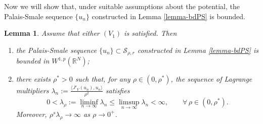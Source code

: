 \documentclass[11pt,reqno]{amsart}
\newtheorem{lemma}[theorem]{Lemma}
\theoremstyle{definition}
\numberwithin{equation}{section}
\numberwithin{theorem}{section}
\numberwithin{equation}{section}
\numberwithin{theorem}{section}
\newcommand{\rn}{\mathbb{R}^N}
\begin{document}
Now we will show that, under suitable assumptions about the potential, the Palais-Smale sequence $\{u_n\}$ constructed in Lemma \ref{lemma-bdPS} is bounded.
\begin{lemma}\label{lemma-bd-lambda>0}
Assume that either $(V_1)$ %
is satisfied. %
Then 
\begin{enumerate}
    \item the Palais-Smale sequence $\{u_n\}\subset \mathcal{S}_{\rho,r}$ constructed in Lemma \ref{lemma-bdPS} is bounded in $W^{1,p}(\rn)$;
    \item there exists $\rho^*>0$ such that, for any $\rho\in(0,\rho^*)$, the sequence of Lagrange multipliers $\lambda_n:=\frac{\langle J'_V(u_n),u_n\rangle}{\rho^2}$ satisfies 
    \begin{equation}\label{lambda-infty}
    0<\lambda_\rho:=\liminf_{n\to\infty}\lambda_n\le \limsup_{n\to\infty}\lambda_n<\infty,\qquad\forall\,\rho\in(0,\rho^*).
    \end{equation}
    Moreover, $\rho^s\lambda_\rho\to \infty$ as $\rho\to 0^+$.
\end{enumerate}
\end{lemma}
\end{document}
